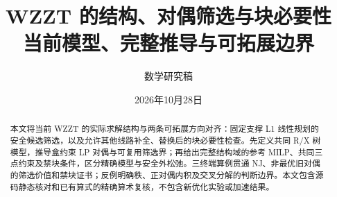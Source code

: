 \documentclass[UTF8,11pt,fontset=windows]{ctexart}
\title{WZZT 的结构、对偶筛选与块必要性\\[3pt]\large 当前模型、完整推导与可拓展边界}
\author{数学研究稿}\date{2026年10月28日}
\numberwithin{equation}{section}
\theoremstyle{remark}\newtheorem{remark}[definition]{说明}
\begin{document}
\maketitle
\begin{abstract}
本文将当前 WZZT 的实际求解结构与两条可拓展方向对齐：固定支撑 L1 线性规划的安全候选筛选，以及允许其他线路补全、替换后的块必要性检查。先定义共同 R/X 树模型，推导盒约束 LP 对偶与可复用筛选界；再给出完整结构域的参考 MILP、共同三点约束及禁块条件，区分精确模型与安全外松弛。三终端算例贯通 NJ、非最优旧对偶的筛选价值和禁块证书；反例明确秩、正对偶内积及交叉分解的判断边界。本文包含源码静态核对和已有算式的精确算术复核，不包含新优化实验或加速结果。
\end{abstract}



\begingroup\small\raggedright\setlength{\bibsep}{2pt}

\endgroup
\end{document}
